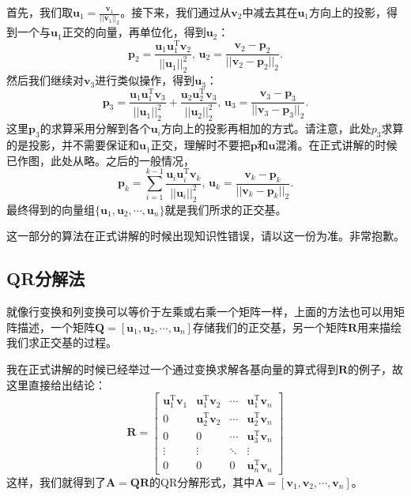 \documentclass[a4paper, 12pt]{article}
\begin{document}
    首先，我们取$\boldsymbol u_1=\frac{\boldsymbol v_1}{||\boldsymbol v_1||_2}$。接下来，我们通过从$\boldsymbol v_2$中减去其在$\boldsymbol u_1$方向上的投影，得到一个与$\boldsymbol u_1$正交的向量，再单位化，得到$\boldsymbol u_2$：
    \[
    \boldsymbol p_2=\frac{\boldsymbol u_1\boldsymbol u_1^\mathrm T\boldsymbol v_2}{||\boldsymbol u_1||_2^2},\,\boldsymbol u_2=\frac{\boldsymbol v_2-\boldsymbol p_2}{||\boldsymbol v_2-\boldsymbol p_2||_2}.
    \]
    然后我们继续对$\boldsymbol v_3$进行类似操作，得到$\boldsymbol u_3$：
    \[
    \boldsymbol p_3=\frac{\boldsymbol u_1\boldsymbol u_1^\mathrm T\boldsymbol v_3}{||\boldsymbol u_1||_2^2}+\frac{\boldsymbol u_2\boldsymbol u_2^\mathrm T\boldsymbol v_3}{||\boldsymbol u_2||_2^2},\,\boldsymbol u_3=\frac{\boldsymbol v_3-\boldsymbol p_3}{||\boldsymbol v_3-\boldsymbol p_3||_2}.
    \]
    这里$\boldsymbol p_3$的求算采用分解到各个$\boldsymbol u_i$方向上的投影再相加的方式。请注意，此处$p_3$求算的是投影，并不需要保证和$\boldsymbol u_1$正交，理解时不要把$\boldsymbol p$和$\boldsymbol u$混淆。在正式讲解的时候已作图，此处从略。之后的一般情况，
    \[
    \boldsymbol p_k=\sum_{i=1}^{k-1}\frac{\boldsymbol u_i\boldsymbol u_i^\mathrm T\boldsymbol v_k}{||\boldsymbol u_i||_2^2},\,\boldsymbol u_k=\frac{\boldsymbol v_k-\boldsymbol p_k}{||\boldsymbol v_k-\boldsymbol p_k||_2}.
    \]
    最终得到的向量组$\{\boldsymbol u_1,\boldsymbol u_2,\cdots,\boldsymbol u_n\}$就是我们所求的正交基。

    这一部分的算法在正式讲解的时候出现知识性错误，请以这一份为准。非常抱歉。

    \subsection{QR分解法}

    就像行变换和列变换可以等价于左乘或右乘一个矩阵一样，上面的方法也可以用矩阵描述，一个矩阵$\boldsymbol Q=[\boldsymbol u_1,\boldsymbol u_2,\cdots,\boldsymbol u_n]$存储我们的正交基，另一个矩阵$\boldsymbol R$用来描绘我们求正交基的过程。
    
    我在正式讲解的时候已经举过一个通过变换求解各基向量的算式得到$\boldsymbol R$的例子，故这里直接给出结论：
    \[
    \boldsymbol R=
    \begin{bmatrix}
        \boldsymbol u_1^\mathrm T\boldsymbol v_1 & \boldsymbol u_1^\mathrm T\boldsymbol v_2 & \cdots & \boldsymbol u_1^\mathrm T\boldsymbol v_n \\
        0 & \boldsymbol u_2^\mathrm T\boldsymbol v_2 & \cdots & \boldsymbol u_2^\mathrm T\boldsymbol v_n \\
        0 & 0 & \cdots & \boldsymbol u_3^\mathrm T\boldsymbol v_n \\
        \vdots & \vdots & \ddots & \vdots \\
        0 & 0 & 0 & \boldsymbol u_n^\mathrm T\boldsymbol v_n
    \end{bmatrix}
    \]
    这样，我们就得到了$\boldsymbol A=\boldsymbol Q\boldsymbol R$的QR分解形式，其中$\boldsymbol A=[\boldsymbol v_1,\boldsymbol v_2,\cdots,\boldsymbol v_n]$。
\end{document}
